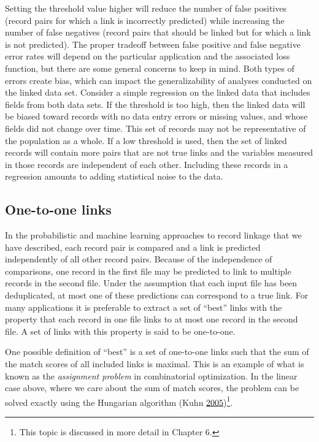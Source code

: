 \documentclass[]{krantz}
\begin{document}
Setting the threshold value higher will reduce the number of false
positives (record pairs for which a link is incorrectly predicted) while
increasing the number of false negatives (record pairs that should be
linked but for which a link is not predicted). The proper tradeoff
between false positive and false negative error rates will depend on the
particular application and the associated loss function, but there are
some general concerns to keep in mind. Both types of errors create bias,
which can impact the generalizability of analyses conducted on the
linked data set. Consider a simple regression on the linked data that
includes fields from both data sets. If the threshold is too high, then
the linked data will be biased toward records with no data entry errors
or missing values, and whose fields did not change over time. This set
of records may not be representative of the population as a whole. If a
low threshold is used, then the set of linked records will contain more
pairs that are not true links and the variables measured in those
records are independent of each other. Including these records in a
regression amounts to adding statistical noise to the data.

\subsection{One-to-one links}\label{one-to-one-links}

In the probabilistic and machine learning approaches to record linkage
that we have described, each record pair is compared and a link is
predicted independently of all other record pairs. Because of the
independence of comparisons, one record in the first file may be
predicted to link to multiple records in the second file. Under the
assumption that each input file has been deduplicated, at most one of
these predictions can correspond to a true link. For many applications
it is preferable to extract a set of ``best'' links with the property
that each record in one file links to at most one record in the second
file. A set of links with this property is said to be one-to-one.

\enlargethispage{12pt} One possible definition of ``best'' is a set of
one-to-one links such that the sum of the match scores of all included
links is maximal. This is an example of what is known as the
\emph{assignment problem} in combinatorial optimization. In the linear
case above, where we care about the sum of match scores, the problem can
be solved exactly using the Hungarian algorithm (Kuhn
\protect\hyperlink{ref-kuhn2005hungarian}{2005})\footnote{This topic is
  discussed in more detail in Chapter 6.}.
\end{document}
